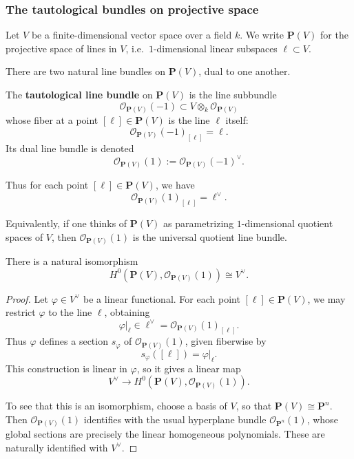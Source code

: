 \documentclass[12pt]{article}
\begin{document}
\subsubsection{The tautological bundles on projective space}

Let \(V\) be a finite-dimensional vector space over a field \(k\). We write $\mathbf P(V)$
for the projective space of lines in \(V\), i.e.\ \(1\)-dimensional linear subspaces \(\ell \subset V\).

There are two natural line bundles on \(\mathbf P(V)\), dual to one another.

\begin{definition}
    The \textbf{tautological line bundle} on \(\mathbf P(V)\) is the line subbundle
    \[
        \mathcal O_{\mathbf P(V)}(-1)\subset V\otimes_k \mathcal O_{\mathbf P(V)}
    \]
    whose fiber at a point \([\ell]\in \mathbf P(V)\) is the line \(\ell\) itself:
    \[
        \mathcal O_{\mathbf P(V)}(-1)_{[\ell]}=\ell.
    \]
    Its dual line bundle is denoted
    \[
        \mathcal O_{\mathbf P(V)}(1):=\mathcal O_{\mathbf P(V)}(-1)^\vee.
    \]
\end{definition}

Thus for each point \([\ell]\in \mathbf P(V)\), we have
\[
    \mathcal O_{\mathbf P(V)}(1)_{[\ell]}=\ell^\vee.
\]

Equivalently, if one thinks of \(\mathbf P(V)\) as parametrizing \(1\)-dimensional quotient spaces of \(V\), then \(\mathcal O_{\mathbf P(V)}(1)\) is the universal quotient line bundle.

\begin{proposition}
    There is a natural isomorphism
    \[
        H^0(\mathbf P(V),\mathcal O_{\mathbf P(V)}(1))\cong V^\vee.
    \]
\end{proposition}

\begin{proof}
    Let \(\varphi\in V^\vee\) be a linear functional. For each point \([\ell]\in \mathbf P(V)\), we may restrict \(\varphi\) to the line \(\ell\), obtaining
    \[
        \varphi|_\ell \in \ell^\vee=\mathcal O_{\mathbf P(V)}(1)_{[\ell]}.
    \]
    Thus \(\varphi\) defines a section \(s_\varphi\) of \(\mathcal O_{\mathbf P(V)}(1)\), given fiberwise by
    \[
        s_\varphi([\ell])=\varphi|_\ell.
    \]
    This construction is linear in \(\varphi\), so it gives a linear map
    \[
        V^\vee \longrightarrow H^0(\mathbf P(V),\mathcal O_{\mathbf P(V)}(1)).
    \]

    To see that this is an isomorphism, choose a basis of \(V\), so that \(\mathbf P(V)\cong \mathbf P^n\). Then \(\mathcal O_{\mathbf P(V)}(1)\) identifies with the usual hyperplane bundle \(\mathcal O_{\mathbf P^n}(1)\), whose global sections are precisely the linear homogeneous polynomials. These are naturally identified with \(V^\vee\).
\end{proof}
\end{document}
